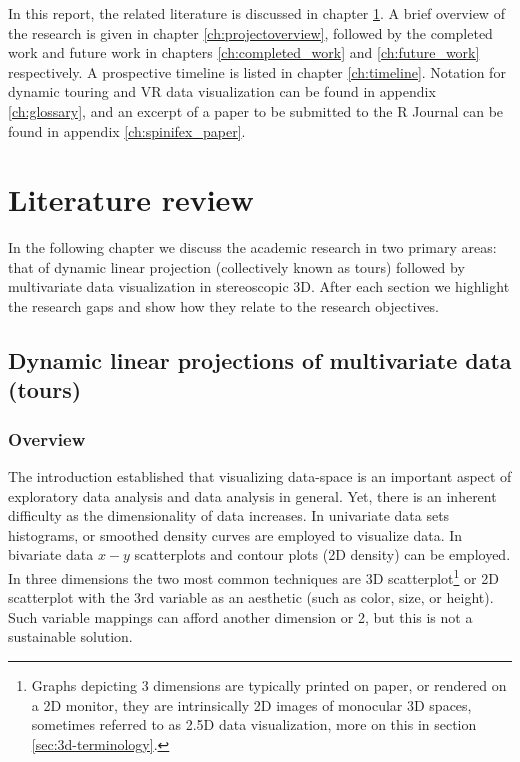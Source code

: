 \documentclass{monashthesis}
\begin{document}
In this report, the related literature is discussed in chapter
\ref{ch:lit_review}. A brief overview of the research is given in
chapter \ref{ch:projectoverview}, followed by the completed work and
future work in chapters \ref{ch:completed_work} and \ref{ch:future_work}
respectively. A prospective timeline is listed in chapter
\ref{ch:timeline}. Notation for dynamic touring and VR data
visualization can be found in appendix \ref{ch:glossary}, and an excerpt
of a paper to be submitted to the R Journal can be found in appendix
\ref{ch:spinifex_paper}.

\chapter{Literature review}\label{ch:lit_review}

In the following chapter we discuss the academic research in two primary
areas: that of dynamic linear projection (collectively known as tours)
followed by multivariate data visualization in stereoscopic 3D. After
each section we highlight the research gaps and show how they relate to
the research objectives.

\section{Dynamic linear projections of multivariate data
(tours)}\label{sec:tour}

\subsection{Overview}\label{overview}

The introduction established that visualizing data-space is an important
aspect of exploratory data analysis and data analysis in general. Yet,
there is an inherent difficulty as the dimensionality of data increases.
In univariate data sets histograms, or smoothed density curves are
employed to visualize data. In bivariate data \(x-y\) scatterplots and
contour plots (2D density) can be employed. In three dimensions the two
most common techniques are 3D
scatterplot\footnote{Graphs depicting 3 dimensions are typically printed on paper, or rendered on a 2D monitor, they are intrinsically 2D images of monocular 3D spaces, sometimes referred to as 2.5D data visualization, more on this in section \ref{sec:3d-terminology}.}
or 2D scatterplot with the 3rd variable as an aesthetic (such as color,
size, or height). Such variable mappings can afford another dimension or
2, but this is not a sustainable solution.
\end{document}
